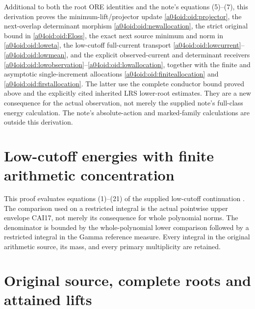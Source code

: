 Additional to both the root ORE identities and the note's equations
(5)--(7), this derivation proves the minimum-lift/projector update
\eqref{a04oid:oid:projector}, the next-overlap determinant morphism
\eqref{a04oid:oid:newallocation}, the strict original bound in
\eqref{a04oid:oid:Eloss}, the exact next source minimum and norm in
\eqref{a04oid:oid:loweta}, the low-cutoff full-current transport
\eqref{a04oid:oid:lowcurrent}--\eqref{a04oid:oid:lowmean}, and the explicit
observed-current and determinant receivers
\eqref{a04oid:oid:lowobservation}--\eqref{a04oid:oid:lowallocation}, together with
the finite and asymptotic single-increment allocations
\eqref{a04oid:oid:finiteallocation} and \eqref{a04oid:oid:firstallocation}.
The latter use the complete conductor bound proved above and the
explicitly cited inherited LRS lower-root estimates. They are a new
consequence for the actual observation, not merely the supplied
note's full-class energy calculation. The note's absolute-action
and marked-family calculations are outside this derivation.




\endgroup

\clearpage
\begingroup
\def\C{\mathbb C}
\def\R{\mathbb R}
\def\PP{\mathcal P}
\def\norm#1{\left\lVert#1\right\rVert}
\def\ip#1#2{\left\langle#1,#2\right\rangle}
\def\cond{\operatorname{cond}}

\setcounter{equation}{0}
\renewcommand{\theequation}{A04LCS.\arabic{equation}}
\section*{Low-cutoff energies with finite arithmetic concentration}


This proof evaluates equations (1)--(21) of the supplied low-cutoff
continuation \cite{a04lcs:lce}. The comparison used on a restricted integral is
the actual pointwise upper envelope CAI17, not merely its consequence
for whole polynomial norms. The denominator is bounded by the
whole-polynomial lower comparison followed by a restricted integral in
the Gamma reference measure. Every integral in the original arithmetic
source, its mass, and every primary multiplicity are retained.

\section{Original source, complete roots and attained lifts}

